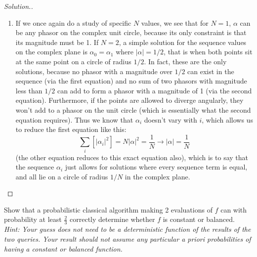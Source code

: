 \documentclass[12pt]{article}
\newenvironment{problem}[2][Problem]{\begin{trivlist}
\item[\hskip \labelsep {\bfseries #1}\hskip \labelsep {\bfseries #2.}]}{\end{trivlist}}
\begin{document}
\begin{proof}[Solution.]
\begin{enumerate}[label=(\alph*)]
\item If we once again do a study of specific $N$ values, we see that for $N=1$, $\alpha$ can be any phasor on the complex
unit circle, because its only constraint is that its magnitude must be 1. If $N=2$, a simple solution for the sequence values
on the complex plane is $\alpha_0=\alpha_1$ where $|\alpha|=1/2$, that is when both points sit at the same point on a circle
of radius $1/2$. In fact, these are the only solutions, because no phasor with a magnitude over $1/2$ can exist in the
sequence (via the first equation) and no sum of two phasors with magnitude less than $1/2$ can add to form a phasor with a
magnitude of 1 (via the second equation). Furthermore, if the points are allowed to diverge angularly, they won't add to
a phasor on the unit circle (which is essentially what the second equation requires). Thus we know that $\alpha_i$ doesn't
vary with $i$, which allows us to reduce the first equation like this:
$$\sum_i[|\alpha_i|^2]=N|\alpha|^2=\frac{1}{N}\to|\alpha|=\frac{1}{N}$$
(the other equation reduces to this exact equation also), which is to say that the sequence $\alpha_i$ just allows for
solutions where every sequence term is equal, and all lie on a circle of radius $1/N$ in the complex plane.
\end{enumerate}
\end{proof}

\begin{problem}{6.4.2a}
Show that a probabilistic classical algorithm making 2 evaluations of $f$ can with
probability at least $\frac{2}{3}$ correctly determine whether $f$ is constant or balanced.\\[0.3in]
\emph{Hint: Your guess does not need to be a deterministic function of the results of the two queries. Your result
should not assume any particular a priori probabilities of having a constant or balanced function.}
\end{problem}
\end{document}
